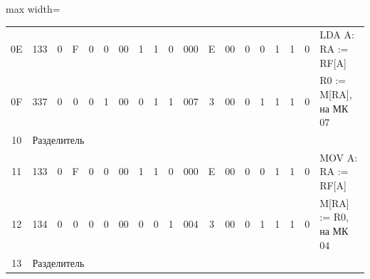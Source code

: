 \documentclass[11pt, a4paper]{article}
\begin{document}
{\begin{table}[h!]
\begin{adjustbox}{max width=\textwidth}
\begin{tabular}{|c|c|c|c|c|c|c|c|c|c|c|c|c|c|c|c|c|c|l|}
				0E          & 133                               & 0                                 & F                                      & 0                                      & 0             & 00          & 1                                       & 1                                     & 0                    & 000            & E             & 00         & 0          & 0            & 1           & 1            & 0           & LDA A: RA := RF[A]             \\
				0F          & 337                               & 0                                 & 0                                      & 0                                      & 1             & 00          & 0                                       & 1                                     & 1                    & 007            & 3             & 00         & 0          & 1            & 1           & 1            & 0           & R0 := M[RA], на МК 07          \\
				10          & \multicolumn{18}{l|}{Разделитель}                                                                                                                                                                                                                                                                                                                                                                                                                    \\
				11          & 133                               & 0                                 & F                                      & 0                                      & 0             & 00          & 1                                       & 1                                     & 0                    & 000            & E             & 00         & 0          & 0            & 1           & 1            & 0           & MOV A: RA := RF[A]             \\
				12          & 134                               & 0                                 & 0                                      & 0                                      & 0             & 00          & 0                                       & 0                                     & 1                    & 004            & 3             & 00         & 0          & 1            & 1           & 1            & 0           & M[RA] := R0, на МК 04          \\
				13          & \multicolumn{18}{l|}{Разделитель}                                                                                                                                                                                                                                                                                                                                                                                                                    \\

\end{tabular}
\end{adjustbox}
\end{table}}
\end{document}
